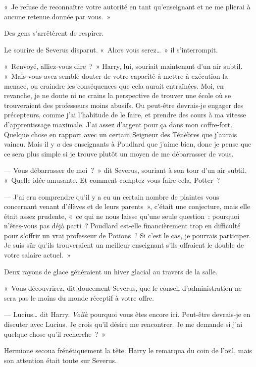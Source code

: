«~Je refuse de reconnaître votre autorité en tant qu'enseignant et ne me plierai à aucune retenue donnée par vous.~»

Des gens s'arrêtèrent de respirer.

Le sourire de Severus disparut.
«~Alors vous serez…~»
il s'interrompit.

«~Renvoyé, alliez-vous dire~?~»
Harry, lui, souriait maintenant d'un air subtil.
«~Mais vous avez semblé douter de votre capacité à mettre à exécution la menace, ou craindre les conséquences que cela aurait entraînées.
Moi, en revanche, je ne doute ni ne crains la perspective de trouver une école où se trouveraient des professeurs moins abusifs.
Ou peut-être devrais-je engager des précepteurs, comme j'ai l'habitude de le faire, et prendre des cours à ma vitesse d'apprentissage maximale.
J'ai assez d'argent pour ça dans mon coffre-fort.
Quelque chose en rapport avec un certain Seigneur des Ténèbres que j'aurais vaincu.
Mais il y \emph{a} des enseignants à Poudlard que j'aime bien, donc je pense que ce sera plus simple si je trouve plutôt un moyen de me débarrasser de vous.

--- Vous débarrasser de moi~?~»
dit Severus, souriant à son tour d'un air subtil.
«~Quelle idée amusante.
Et comment comptez-vous faire cela, Potter~?

--- J'ai cru comprendre qu'il y a eu un certain nombre de plaintes vous concernant venant d'élèves et de leurs parents~», c'était une conjecture, mais elle était assez prudente, «~ce qui ne nous laisse qu'une seule question~: pourquoi n'êtes-vous pas déjà parti~?
Poudlard est-elle financièrement trop en difficulté pour s'offrir un vrai professeur de Potions~?
Si c'est le cas, je pourrais participer.
Je suis sûr qu'ils trouveraient un meilleur enseignant s'ils offraient le double de votre salaire actuel.~»

Deux rayons de glace généraient un hiver glacial au travers de la salle.

«~Vous découvrirez, dit doucement Severus, que le conseil d'administration ne sera pas le moins du monde réceptif à votre offre.

--- Lucius… dit Harry.
\emph{Voilà} pourquoi vous êtes encore ici.
Peut-être devrais-je en discuter avec Lucius.
Je crois qu'il désire me rencontrer.
Je me demande si j'ai quelque chose qu'il recherche~?~»

Hermione secoua frénétiquement la tête.
Harry le remarqua du coin de l'œil, mais son attention était toute sur Severus.

